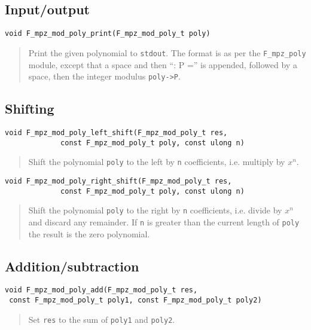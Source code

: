 \documentclass[a4paper,10pt]{article}
\newcommand{\code}{\lstinline}
\begin{document}
\subsection{Input/output}

\begin{lstlisting}
void F_mpz_mod_poly_print(F_mpz_mod_poly_t poly)
\end{lstlisting}
\begin{quote}
Print the given polynomial to \code{stdout}. The format is as per the \code{F_mpz_poly} module, except that
a space and then ``: P ='' is appended, followed by a space, then the integer modulus \code{poly->P}.
\end{quote}

\subsection{Shifting}

\begin{lstlisting}
void F_mpz_mod_poly_left_shift(F_mpz_mod_poly_t res, 
             const F_mpz_mod_poly_t poly, const ulong n)
\end{lstlisting}
\begin{quote}
Shift the polynomial \code{poly} to the left by \code{n} coefficients, i.e. multiply by $x^n$.
\end{quote}

\begin{lstlisting}
void F_mpz_mod_poly_right_shift(F_mpz_mod_poly_t res, 
             const F_mpz_mod_poly_t poly, const ulong n)
\end{lstlisting}
\begin{quote}
Shift the polynomial \code{poly} to the right by \code{n} coefficients, i.e. divide by $x^n$ and discard
any remainder. If \code{n} is greater than the current length of \code{poly} the result is the zero 
polynomial.
\end{quote}

\subsection{Addition/subtraction}

\begin{lstlisting}
void F_mpz_mod_poly_add(F_mpz_mod_poly_t res, 
 const F_mpz_mod_poly_t poly1, const F_mpz_mod_poly_t poly2)
\end{lstlisting}
\begin{quote}
Set \code{res} to the sum of \code{poly1} and \code{poly2}.
\end{quote}
\end{document}
